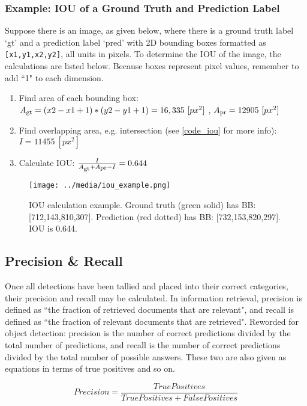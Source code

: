 \subsubsection{Example: IOU of a Ground Truth and Prediction Label}
Suppose there is an image, as given below, where there is a ground truth label `gt' and a prediction label `pred' with 2D bounding boxes formatted as \texttt{[x1,y1,x2,y2]}, all units in pixels. To determine the IOU of the image, the calculations are listed below. Because boxes represent pixel values, remember to add ``1" to each dimension.

\def \pxpx {\ [px^2]}
\def \Asub #1{A\textsubscript{#1}}
\begin{enumerate}\itemsep=-0.5em
    \item Find area of each bounding box: \\ $\Asub{gt} = (x2-x1+1)*(y2-y1+1) = 16,335 \pxpx $ , $ \Asub{pr} = 12905 \pxpx $
    \item Find overlapping area, e.g. intersection (see \ref{code_iou} for more info): $I = 11455 \pxpx $
    \item Calculate IOU: $\frac{I}{\Asub{gt} + \Asub{pr} - I} = 0.644 $
\end{enumerate}

\begin{figure}[h]
    \centering
    \texttt{[image: ../media/iou\_example.png]}
    \caption{IOU calculation example. Ground truth (green solid) has BB: [712,143,810,307]. Prediction (red dotted) has BB: [732,153,820,297]. IOU is 0.644.}
    \label{iou_example} %
\end{figure}


\subsection{Precision \& Recall}
Once all detections have been tallied and placed into their correct categories, their precision and recall may be calculated. In information retrieval, precision is defined as ``the fraction of retrieved documents that are relevant", and recall is defined as ``the fraction of relevant documents that are retrieved". Reworded for object detection: precision is the number of correct predictions divided by the total number of predictions, and recall is the number of correct predictions divided by the total number of possible answers. These two are also given as equations in terms of true positives and so on. 

\begin{equation}
Precision = \frac{TruePositives}{TruePositives + FalsePositives}
\label{eq_prec}
\end{equation}

